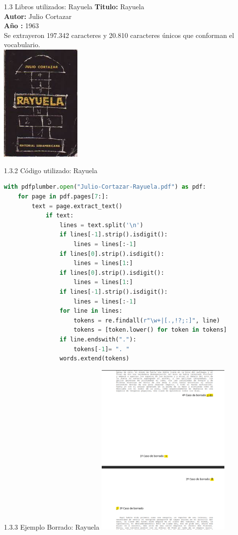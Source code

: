 \documentclass{beamer}
\begin{document}
\begin{frame}{1.3 Libros utilizados: Rayuela}
	\justifying
	\textbf{Titulo:} Rayuela\\
	\textbf{Autor:} Julio Cortazar\\
	\textbf{Año :} 1963\\
	Se extrayeron 197.342 caracteres y 20.810 caracteres únicos que conforman el vocabulario.\\
	\centering
	\vspace{0.2cm}
	\includegraphics[width=0.3\textwidth]{rayuela_cortazar}
	
\end{frame}
	
\begin{frame}[fragile]{1.3.2 Código utilizado: Rayuela}
\begin{lstlisting}[language=Python]
with pdfplumber.open("Julio-Cortazar-Rayuela.pdf") as pdf:
	for page in pdf.pages[7:]:
		text = page.extract_text()
			if text:
				lines = text.split('\n')
				if lines[-1].strip().isdigit():
					lines = lines[:-1]
				if lines[0].strip().isdigit():
					lines = lines[1:]
				if lines[0].strip().isdigit():
					lines = lines[1:]
				if lines[-1].strip().isdigit():
					lines = lines[:-1]
				for line in lines:
					tokens = re.findall(r"\w+|[.,!?;:]", line)
					tokens = [token.lower() for token in tokens]
				if line.endswith("."):
					tokens[-1]= ". "
				words.extend(tokens)
\end{lstlisting}
	
\end{frame}
	
	
\begin{frame}{1.3.3 Ejemplo Borrado: Rayuela}
	\centering
	\includegraphics[width=0.5\textwidth]{borrado_rayuela}
	
\end{frame}	
	
\end{document}
